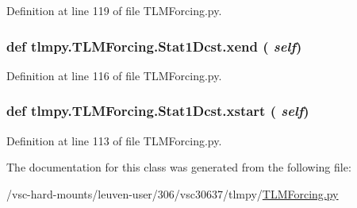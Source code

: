Definition at line 119 of file TLMForcing.py.\hypertarget{classtlmpy_1_1TLMForcing_1_1Stat1Dcst_a2b3e840f49e48f3b58b435ae289f6e56}{
\subsubsection[{xend}]{\setlength{\rightskip}{0pt plus 5cm}def tlmpy.TLMForcing.Stat1Dcst.xend ( {\em self})}}
\label{classtlmpy_1_1TLMForcing_1_1Stat1Dcst_a2b3e840f49e48f3b58b435ae289f6e56}


Definition at line 116 of file TLMForcing.py.\hypertarget{classtlmpy_1_1TLMForcing_1_1Stat1Dcst_acad6d99ce5212e2194dafa2f5faa8e77}{
\subsubsection[{xstart}]{\setlength{\rightskip}{0pt plus 5cm}def tlmpy.TLMForcing.Stat1Dcst.xstart ( {\em self})}}
\label{classtlmpy_1_1TLMForcing_1_1Stat1Dcst_acad6d99ce5212e2194dafa2f5faa8e77}


Definition at line 113 of file TLMForcing.py.

The documentation for this class was generated from the following file:\begin{DoxyCompactItemize}
\item 
/vsc-\/hard-\/mounts/leuven-\/user/306/vsc30637/tlmpy/\hyperlink{TLMForcing_8py}{TLMForcing.py}\end{DoxyCompactItemize}
